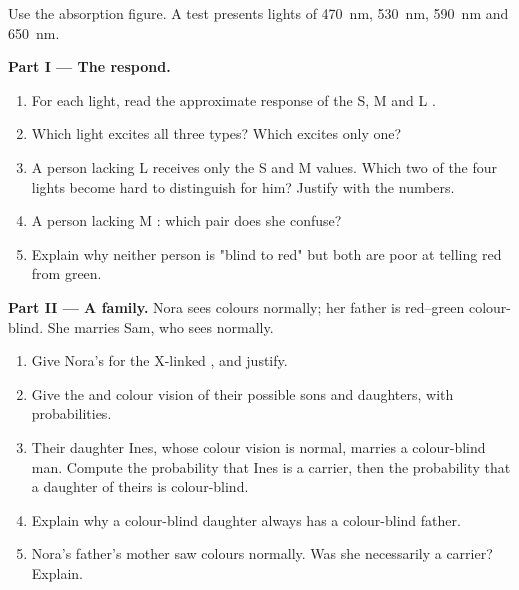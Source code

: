 \begin{problem}
\label{pb:g11:the-eye:1}
Use the absorption figure. A test presents lights of \qty{470}{nm},
\qty{530}{nm}, \qty{590}{nm} and \qty{650}{nm}.

\medskip
\noindent\textbf{Part I --- The  respond.}
\begin{enumerate}
  \item For each light, read the approximate response of the S, M and
        L .
  \item Which light excites all three types? Which excites only one?
  \item A person lacking L  receives only the S and M values.
        Which two of the four lights become hard to distinguish for
        him? Justify with the numbers.
  \item A person lacking M : which pair does she confuse?
  \item Explain why neither person is "blind to red" but both are
        poor at telling red from green.
\end{enumerate}

\medskip
\noindent\textbf{Part II --- A family.}
Nora sees colours normally; her father is red--green colour-blind. She
marries Sam, who sees normally.
\begin{enumerate}[resume]
  \item Give Nora's  for the X-linked  , and justify.
  \item Give the  and colour vision of their possible sons and
        daughters, with probabilities.
  \item Their daughter Ines, whose colour vision is normal, marries a
        colour-blind man. Compute the probability that Ines is a
        carrier, then the probability that a daughter of theirs is
        colour-blind.
  \item Explain why a colour-blind daughter always has a colour-blind
        father.
  \item Nora's father's mother saw colours normally. Was she
        necessarily a carrier? Explain.
\end{enumerate}


\end{problem}
